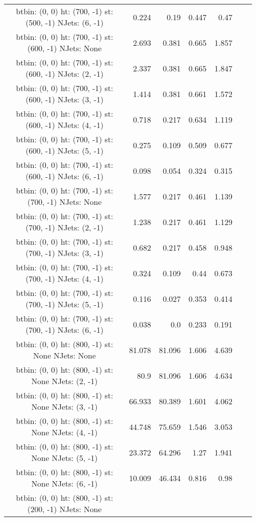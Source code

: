 \documentclass[12pt]{paper}
\begin{document}
\begin{landscape}
\begin{longtable}{c|r|r|r|r|r|r}
btbin:  (0, 0) ht:  (700, -1) st:  (500, -1) NJets:  (6, -1)
 & 0.224 & 0.19 & 0.447 & 0.47\\
btbin:  (0, 0) ht:  (700, -1) st:  (600, -1) NJets:  None
 & 2.693 & 0.381 & 0.665 & 1.857\\
btbin:  (0, 0) ht:  (700, -1) st:  (600, -1) NJets:  (2, -1)
 & 2.337 & 0.381 & 0.665 & 1.847\\
btbin:  (0, 0) ht:  (700, -1) st:  (600, -1) NJets:  (3, -1)
 & 1.414 & 0.381 & 0.661 & 1.572\\
btbin:  (0, 0) ht:  (700, -1) st:  (600, -1) NJets:  (4, -1)
 & 0.718 & 0.217 & 0.634 & 1.119\\
btbin:  (0, 0) ht:  (700, -1) st:  (600, -1) NJets:  (5, -1)
 & 0.275 & 0.109 & 0.509 & 0.677\\
btbin:  (0, 0) ht:  (700, -1) st:  (600, -1) NJets:  (6, -1)
 & 0.098 & 0.054 & 0.324 & 0.315\\
btbin:  (0, 0) ht:  (700, -1) st:  (700, -1) NJets:  None
 & 1.577 & 0.217 & 0.461 & 1.139\\
btbin:  (0, 0) ht:  (700, -1) st:  (700, -1) NJets:  (2, -1)
 & 1.238 & 0.217 & 0.461 & 1.129\\
btbin:  (0, 0) ht:  (700, -1) st:  (700, -1) NJets:  (3, -1)
 & 0.682 & 0.217 & 0.458 & 0.948\\
btbin:  (0, 0) ht:  (700, -1) st:  (700, -1) NJets:  (4, -1)
 & 0.324 & 0.109 & 0.44 & 0.673\\
btbin:  (0, 0) ht:  (700, -1) st:  (700, -1) NJets:  (5, -1)
 & 0.116 & 0.027 & 0.353 & 0.414\\
btbin:  (0, 0) ht:  (700, -1) st:  (700, -1) NJets:  (6, -1)
 & 0.038 & 0.0 & 0.233 & 0.191\\
btbin:  (0, 0) ht:  (800, -1) st:  None NJets:  None
 & 81.078 & 81.096 & 1.606 & 4.639\\
btbin:  (0, 0) ht:  (800, -1) st:  None NJets:  (2, -1)
 & 80.9 & 81.096 & 1.606 & 4.634\\
btbin:  (0, 0) ht:  (800, -1) st:  None NJets:  (3, -1)
 & 66.933 & 80.389 & 1.601 & 4.062\\
btbin:  (0, 0) ht:  (800, -1) st:  None NJets:  (4, -1)
 & 44.748 & 75.659 & 1.546 & 3.053\\
btbin:  (0, 0) ht:  (800, -1) st:  None NJets:  (5, -1)
 & 23.372 & 64.296 & 1.27 & 1.941\\
btbin:  (0, 0) ht:  (800, -1) st:  None NJets:  (6, -1)
 & 10.009 & 46.434 & 0.816 & 0.98\\
btbin:  (0, 0) ht:  (800, -1) st:  (200, -1) NJets:  None

\end{longtable}
\end{landscape}
\end{document}
